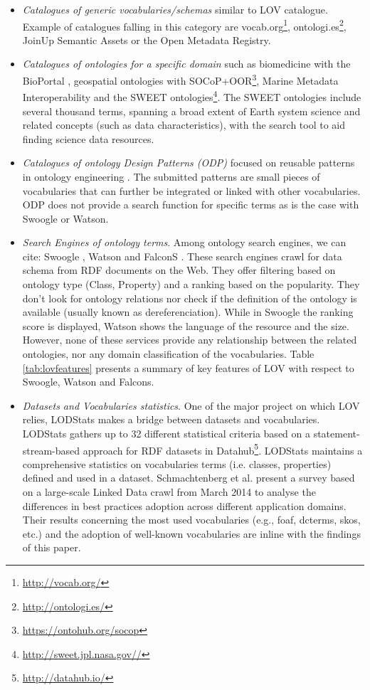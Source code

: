 \documentclass{iosart2c}
\begin{document}
\begin{itemize}
 \item \textit{Catalogues of generic vocabularies/schemas} similar to LOV catalogue. Example of catalogues falling in this category are vocab.org\footnote{\url{http://vocab.org/}}, ontologi.es\footnote{\url{http://ontologi.es/}}, JoinUp Semantic Assets or the Open Metadata Registry.
 \item \textit{Catalogues of ontologies for a specific domain} such as biomedicine with the BioPortal \cite{bioportal11}, geospatial ontologies with SOCoP+OOR\footnote{\url{https://ontohub.org/socop}}, Marine Metadata Interoperability and the SWEET \cite{sweet05} ontologies\footnote{\url{http://sweet.jpl.nasa.gov//}}. The SWEET ontologies include several thousand terms, spanning a broad extent of Earth system science and related concepts (such as data characteristics), with the search tool to aid finding science data resources. 
 \item \textit{Catalogues of ontology Design Patterns (ODP)} focused on reusable patterns in ontology engineering \cite{presutti08}. The submitted patterns are small pieces of vocabularies that can further be integrated or linked with other vocabularies. ODP does not provide a search function for specific terms as is the case with Swoogle or Watson.
 \item \textit{Search Engines of ontology terms}. Among ontology search engines, we can cite: Swoogle \cite{finin2005swoogle}, Watson \cite{d2007watson,Sabou07} and FalconS \cite{cheng2008falcons}. These search engines crawl for data schema from RDF documents on the Web. They offer filtering based on ontology type (Class, Property) and a ranking based on the popularity. They don't look for ontology relations nor check if the definition of the ontology is available (usually known as dereferenciation). While in Swoogle the ranking score is displayed, Watson shows the language of the resource and the size. However, none of these services provide any relationship between the related ontologies, nor any domain classification of the vocabularies. Table \ref{tab:lovfeatures} presents a summary of key features of LOV with respect to Swoogle, Watson and Falcons.
 \item \textit{Datasets and Vocabularies statistics}. One of the major project on which LOV relies, LODStats \cite{demter-2012-ekaw} makes a bridge between datasets and vocabularies. LODStats gathers up to 32 different statistical criteria based on a statement-stream-based approach for RDF datasets in Datahub\footnote{\url{http://datahub.io/}}. LODStats maintains a comprehensive statistics on vocabularies terms (i.e. classes, properties) defined and used in a dataset. Schmachtenberg et al. \cite{max2014} present a survey based on a large-scale Linked Data crawl from March 2014 to analyse the differences in best practices adoption across different application domains. Their results concerning the most used vocabularies (e.g., foaf, dcterms, skos, etc.) and the adoption of well-known vocabularies are inline with the findings of this paper.
\end{itemize}
\end{document}
